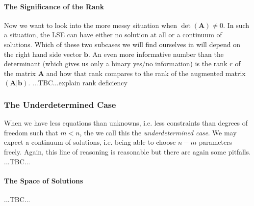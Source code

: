 \paragraph{The Significance of the Rank}
Now we want to look into the more messy situation when $\det(\mathbf{A}) \neq 0$. In such a situation, the LSE can have either no solution at all or a continuum of solutions. Which of these two subcases we will find ourselves in will depend on the right hand side vector $\mathbf{b}$. An even more informative number than the determinant (which gives us only a binary yes/no information) is the rank $r$ of the matrix $\mathbf{A}$ and how that rank compares to the rank of the augmented matrix $(\mathbf{A|b})$. ...TBC...explain rank deficiency








\subsubsection{The Underdetermined Case}
When we have less equations than unknowns, i.e. less constraints than degrees of freedom such that $m < n$, the we call this the \emph{underdetermined case}. We may expect a continuum of solutions, i.e. being able to choose $n-m$ parameters freely. Again, this line of reasoning is reasonable but there are again some pitfalls. ...TBC...

\paragraph{The Space of Solutions} ...TBC...

